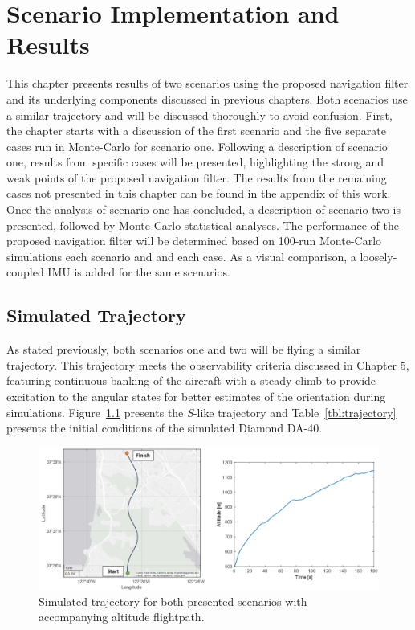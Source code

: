\chapter{Scenario Implementation and Results}
This chapter presents results of two scenarios using the proposed navigation filter and its underlying components discussed in previous chapters. Both scenarios use a similar trajectory and will be discussed thoroughly to avoid confusion. First, the chapter starts with a discussion of the first scenario and the five separate cases run in Monte-Carlo for scenario one. Following a description of scenario one, results from specific cases will be presented, highlighting the strong and weak points of the proposed navigation filter. The results from the remaining cases not presented in this chapter can be found in the appendix of this work. Once the analysis of scenario one has concluded, a description of scenario two is presented, followed by Monte-Carlo statistical analyses. The performance of the proposed navigation filter will be determined based on 100-run Monte-Carlo simulations each scenario and and each case. As a visual comparison, a loosely-coupled IMU is added for the same scenarios.

\section{\textbf{Simulated Trajectory}}
As stated previously, both scenarios one and two will be flying a similar trajectory. This trajectory meets the observability criteria discussed in Chapter 5, featuring continuous banking of the aircraft with a steady climb to provide excitation to the angular states for better estimates of the orientation during simulations. Figure~\ref{fig:trajectory} presents the \textit{S}-like trajectory and Table~\ref{tbl:trajectory} presents the initial conditions of the simulated Diamond DA-40.

\begin{figure}[!ht]
    \centering
    \includegraphics[width=\linewidth]{Figures/trajectoryfigure.png}
    \caption{Simulated trajectory for both presented scenarios with accompanying altitude flightpath. }\label{fig:trajectory}
\end{figure}

